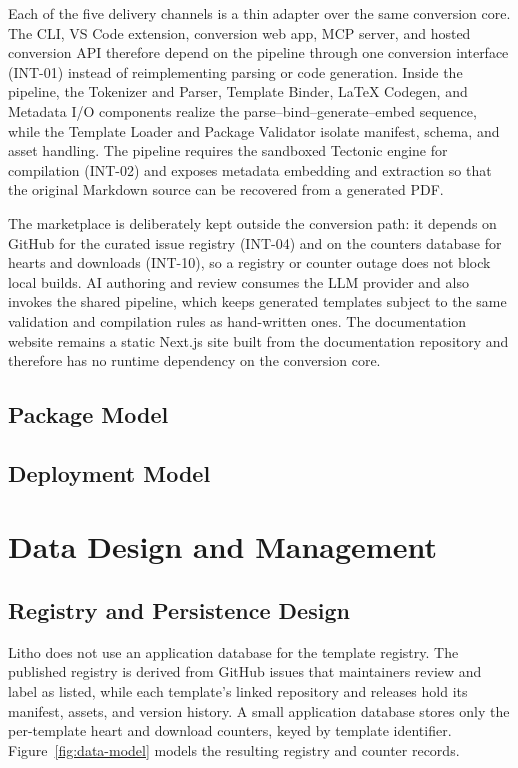 Each of the five delivery channels is a thin adapter over the same conversion core. The CLI, VS Code extension, conversion web app, MCP server, and hosted conversion API therefore depend on the pipeline through one conversion interface (INT-01) instead of reimplementing parsing or code generation. Inside the pipeline, the Tokenizer and Parser, Template Binder, LaTeX Codegen, and Metadata I/O components realize the parse--bind--generate--embed sequence, while the Template Loader and Package Validator isolate manifest, schema, and asset handling. The pipeline requires the sandboxed Tectonic engine for compilation (INT-02) and exposes metadata embedding and extraction so that the original Markdown source can be recovered from a generated PDF.

The marketplace is deliberately kept outside the conversion path: it depends on GitHub for the curated issue registry (INT-04) and on the counters database for hearts and downloads (INT-10), so a registry or counter outage does not block local builds. AI authoring and review consumes the LLM provider and also invokes the shared pipeline, which keeps generated templates subject to the same validation and compilation rules as hand-written ones. The documentation website remains a static Next.js site built from the documentation repository and therefore has no runtime dependency on the conversion core.

\subsection{Package Model}

\subsection{Deployment Model}

\section{Data Design and Management}
\label{sec:data-design}

\subsection{Registry and Persistence Design}
Litho does not use an application database for the template registry. The published registry is derived from GitHub issues that maintainers review and label as listed, while each template's linked repository and releases hold its manifest, assets, and version history. A small application database stores only the per-template heart and download counters, keyed by template identifier. Figure~\ref{fig:data-model} models the resulting registry and counter records.

